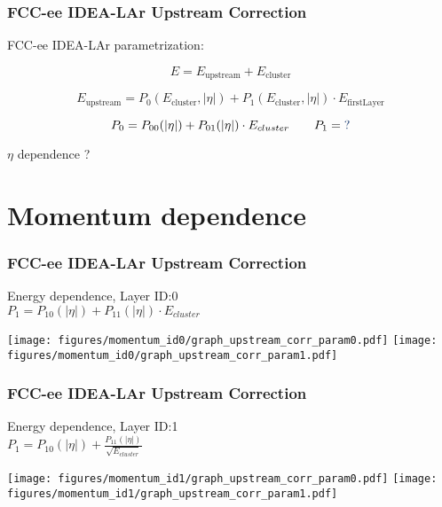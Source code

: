 \documentclass{beamer}
\newcommand{\bluetext}[1]{%
  \textcolor{myBlue}{#1}
}
\newcommand{\redtext}[1]{%
  \textcolor{myRed}{#1}
}
\begin{document}
\begin{frame}
  \frametitle{FCC-ee IDEA-LAr Upstream Correction}

  \redtext{FCC-ee} IDEA-LAr parametrization:

  \begin{equation*}
    E = E_\text{upstream} + E_\text{cluster}
  \end{equation*}

  \begin{equation*}
  E_\text{upstream} = P_0(E_\text{cluster}, |\eta|) +
                      P_1(E_\text{cluster}, |\eta|) \cdot E_\text{firstLayer}
  \end{equation*}

  \begin{equation*}
    P_0 = P_{00}(|\eta|) + P_{01}(|\eta|) \cdot E_{cluster}  \qquad
    P_1 = \bluetext{?}
  \end{equation*}

  \begin{center}
    $\eta$ dependence \bluetext{?}
  \end{center}
\end{frame}


\section{Momentum dependence}
\begin{frame}
  \frametitle{FCC-ee IDEA-LAr Upstream Correction}

  \begin{center}
    Energy dependence, Layer \redtext{ID:\@ 0} \\
    $P_1 = P_{10}(|\eta|) + P_{11}(|\eta|) \cdot E_{cluster}$
  \end{center}

  \texttt{[image: figures/momentum\_id0/graph\_upstream\_corr\_param0.pdf]}
  \texttt{[image: figures/momentum\_id0/graph\_upstream\_corr\_param1.pdf]}
\end{frame}

\begin{frame}
  \frametitle{FCC-ee IDEA-LAr Upstream Correction}

  \begin{center}
    Energy dependence, Layer \redtext{ID:\@ 1} \\
    $ P_1 = P_{10}(|\eta|) + \frac{P_{11}(|\eta|)}{\sqrt{E_{cluster}}} $
  \end{center}

  \texttt{[image: figures/momentum\_id1/graph\_upstream\_corr\_param0.pdf]}
  \texttt{[image: figures/momentum\_id1/graph\_upstream\_corr\_param1.pdf]}
\end{frame}
\end{document}
